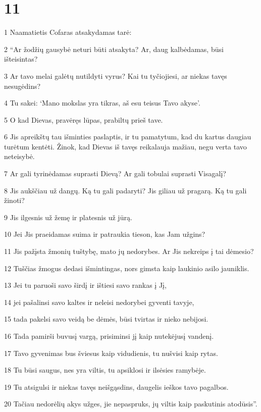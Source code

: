 \chapter{11}


\par 1 Naamatietis Cofaras atsakydamas tarė: 
\par 2 “Ar žodžių gausybė neturi būti atsakyta? Ar, daug kalbėdamas, būsi išteisintas? 
\par 3 Ar tavo melai galėtų nutildyti vyrus? Kai tu tyčiojiesi, ar niekas tavęs nesugėdins? 
\par 4 Tu sakei: ‘Mano mokslas yra tikras, aš esu teisus Tavo akyse’. 
\par 5 O kad Dievas, pravėręs lūpas, prabiltų prieš tave. 
\par 6 Jis apreikštų tau išminties paslaptis, ir tu pamatytum, kad du kartus daugiau turėtum kentėti. Žinok, kad Dievas iš tavęs reikalauja mažiau, negu verta tavo neteisybė. 
\par 7 Ar gali tyrinėdamas suprasti Dievą? Ar gali tobulai suprasti Visagalį? 
\par 8 Jis aukščiau už dangų. Ką tu gali padaryti? Jis giliau už pragarą. Ką tu gali žinoti? 
\par 9 Jis ilgesnis už žemę ir platesnis už jūrą. 
\par 10 Jei Jis praeidamas suima ir patraukia tieson, kas Jam užgins? 
\par 11 Jis pažįsta žmonių tuštybę, mato jų nedorybes. Ar Jis nekreips į tai dėmesio? 
\par 12 Tuščias žmogus dedasi išmintingas, nors gimsta kaip laukinio asilo jauniklis. 
\par 13 Jei tu paruoši savo širdį ir ištiesi savo rankas į Jį, 
\par 14 jei pašalinsi savo kaltes ir neleisi nedorybei gyventi tavyje, 
\par 15 tada pakelsi savo veidą be dėmės, būsi tvirtas ir nieko nebijosi. 
\par 16 Tada pamirši buvusį vargą, prisiminsi jį kaip nutekėjusį vandenį. 
\par 17 Tavo gyvenimas bus šviesus kaip vidudienis, tu nušvisi kaip rytas. 
\par 18 Tu būsi saugus, nes yra viltis, tu apsiklosi ir ilsėsies ramybėje. 
\par 19 Tu atsigulsi ir niekas tavęs neišgąsdins, daugelis ieškos tavo pagalbos. 
\par 20 Tačiau nedorėlių akys užges, jie nepaspruks, jų viltis kaip paskutinis atodūsis”.



